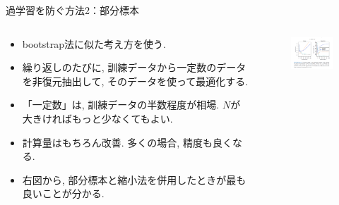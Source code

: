 \documentclass[dvipdfmx,8pt]{beamer}
\begin{document}
  \begin{frame}{過学習を防ぐ方法2：部分標本}
    \begin{columns}[t]
      \begin{column}{0.5\linewidth}
        \begin{itemize}
          \item bootstrap法に似た考え方を使う.
          \item 繰り返しのたびに, 訓練データから一定数のデータを非復元抽出して, そのデータを使って最適化する.
          \item 「一定数」は, 訓練データの半数程度が相場. $N$が大きければもっと少なくてもよい.
          \item 計算量はもちろん改善. 多くの場合, 精度も良くなる.
          \item 右図から, 部分標本と縮小法を併用したときが最も良いことが分かる.
        \end{itemize}
      \end{column}
      \begin{column}{0.5\linewidth}
        \begin{figure}[htb]
          \centering
          \includegraphics[width=5cm,clip]{images/Subsampling.png}
        \end{figure}
      \end{column}
    \end{columns}
  \end{frame}
\end{document}
